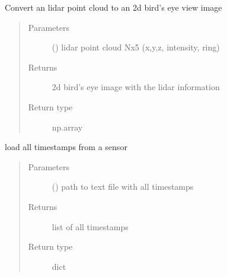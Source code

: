 \documentclass[letterpaper,10pt,english]{sphinxmanual}
\begin{document}
\begin{fulllineitems}
\begin{fulllineitems}
\label{\detokenize{radiate:radiate.Sequence.lidar_to_image}}
Convert an lidar point cloud to an 2d bird’s eye view image
\begin{quote}\begin{description}
\item[{Parameters}] \leavevmode
{} () \textendash{} lidar point cloud Nx5 (x,y,z, intensity, ring)

\item[{Returns}] \leavevmode
2d bird’s eye image with the lidar information

\item[{Return type}] \leavevmode
np.array

\end{description}\end{quote}

\end{fulllineitems}


\begin{fulllineitems}
\label{\detokenize{radiate:radiate.Sequence.load_timestamp}}
load all timestamps from a sensor
\begin{quote}\begin{description}
\item[{Parameters}] \leavevmode
{} () \textendash{} path to text file with all timestamps

\item[{Returns}] \leavevmode
list of all timestamps

\item[{Return type}] \leavevmode
dict

\end{description}\end{quote}

\end{fulllineitems}



\end{fulllineitems}
\end{document}

